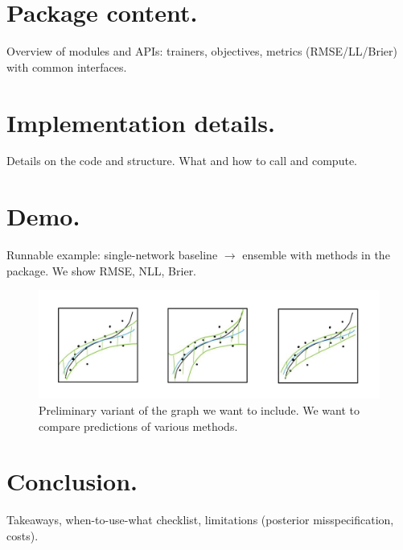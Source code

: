 \documentclass[11pt]{article}
\begin{document}
\section{Package content.} 
Overview of modules and APIs: trainers, objectives, metrics (RMSE/LL/Brier) with common interfaces.  

\section{Implementation details.} 
Details on the code and structure. What and how to call and compute. 

\section{Demo.} 
Runnable example: single-network baseline $\rightarrow$ ensemble with methods in the package. We show RMSE, NLL, Brier.  
\begin{figure}
    \includegraphics[width=1\textwidth]{example_graphs_bmm.jpg}
    \caption{Preliminary variant of the graph we want to include. We want to compare predictions of various methods.}
\end{figure}

\section{Conclusion.} 
Takeaways, when-to-use-what checklist, limitations (posterior misspecification, costs).

\end{document}
